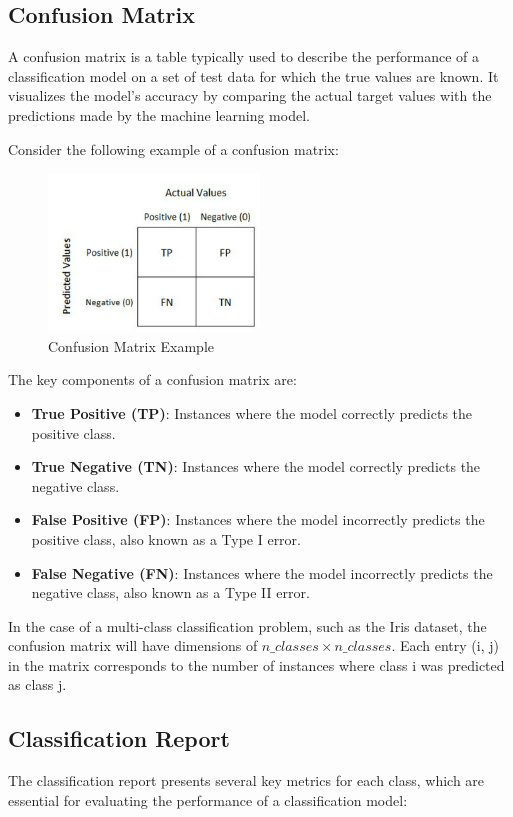 \subsection{Confusion Matrix}
A confusion matrix is a table typically used to describe the performance of a classification model on a set of test data for which the true values are known. It visualizes the model's accuracy by comparing the actual target values with the predictions made by the machine learning model.

Consider the following example of a confusion matrix:
\begin{figure}[h]
	\centering
	\includegraphics[width=0.5\textwidth]{picture/confusion}
	\caption{Confusion Matrix Example}
	\label{fig:confusion_matrix}
\end{figure}

The key components of a confusion matrix are:
\begin{itemize}
	\item \textbf{True Positive (TP)}: Instances where the model correctly predicts the positive class.
	\item \textbf{True Negative (TN)}: Instances where the model correctly predicts the negative class.
	\item \textbf{False Positive (FP)}: Instances where the model incorrectly predicts the positive class, also known as a Type I error.
	\item \textbf{False Negative (FN)}: Instances where the model incorrectly predicts the negative class, also known as a Type II error.
\end{itemize}

In the case of a multi-class classification problem, such as the Iris dataset, the confusion matrix will have dimensions of \( n\_classes \times n\_classes \). Each entry (i, j) in the matrix corresponds to the number of instances where class i was predicted as class j.

\subsection{Classification Report}
The classification report presents several key metrics for each class, which are essential for evaluating the performance of a classification model:

